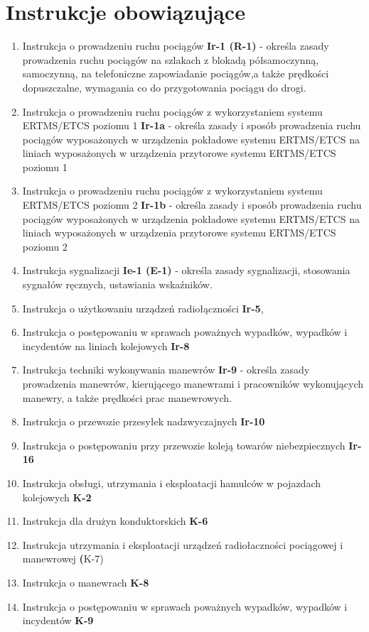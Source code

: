 \chapter{Instrukcje obowiązujące}
\begin{enumerate}
	\item Instrukcja o prowadzeniu ruchu pociągów \textbf{Ir-1 (R-1)} - określa zasady prowadzenia ruchu pociągów na szlakach z blokadą półsamoczynną, samoczynną, na telefoniczne zapowiadanie pociągów,a także prędkości dopuszczalne, wymagania co do przygotowania pociągu do drogi.
	\item Instrukcja o prowadzeniu ruchu pociągów
	z wykorzystaniem systemu ERTMS/ETCS poziomu 1
	\textbf{Ir-1a} - określa zasady i sposób prowadzenia ruchu pociągów wyposażonych
	w urządzenia pokładowe systemu ERTMS/ETCS na liniach wyposażonych w urządzenia przytorowe systemu ERTMS/ETCS poziomu 1
	\item Instrukcja o prowadzeniu ruchu pociągów
	z wykorzystaniem systemu ERTMS/ETCS poziomu 2
	\textbf{Ir-1b} - określa zasady i sposób prowadzenia ruchu pociągów wyposażonych
	w urządzenia pokładowe systemu ERTMS/ETCS na liniach wyposażonych w urządzenia przytorowe systemu ERTMS/ETCS poziomu 2
	\item Instrukcja sygnalizacji \textbf{Ie-1 (E-1)} - określa zasady sygnalizacji, stosowania sygnałów ręcznych, ustawiania wskaźników.
	\item Instrukcja o użytkowaniu urządzeń radiołączności \textbf{Ir-5},
	\item Instrukcja o postępowaniu w sprawach poważnych wypadków, wypadków i incydentów na liniach kolejowych \textbf{Ir-8}
	\item Instrukcja techniki wykonywania manewrów \textbf{Ir-9} - określa zasady prowadzenia manewrów, kierującego manewrami i pracowników wykonujących manewry, a także prędkości prac manewrowych.
	\item Instrukcja o przewozie przesyłek nadzwyczajnych \textbf{Ir-10}
	\item Instrukcja o postępowaniu przy przewozie koleją towarów niebezpiecznych \textbf{Ir-16}
	\item Instrukcja obsługi, utrzymania i eksploatacji hamulców w pojazdach kolejowych \textbf{K-2}
	\item Instrukcja dla drużyn konduktorskich \textbf{K-6}
	\item Instrukcja utrzymania i eksploatacji urządzeń radiołaczności pociągowej i manewrowej \textbf(K-7)
	\item Instrukcja o manewrach \textbf{K-8}
	\item Instrukcja o postępowaniu w sprawach poważnych wypadków, wypadków i incydentów \textbf{K-9}
\end{enumerate}